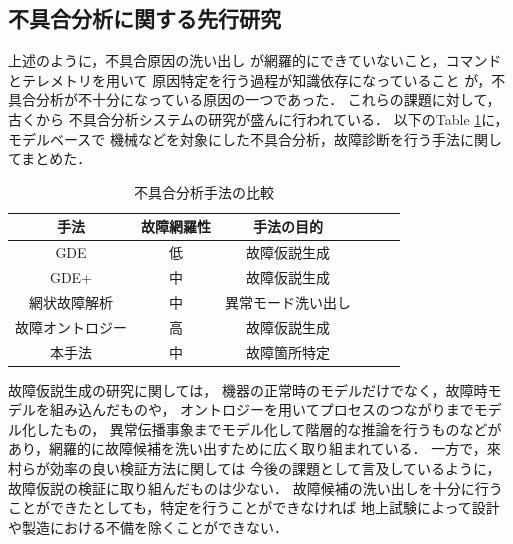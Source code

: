 \documentclass[11pt]{jsreport}
\begin{document}


\subsection{不具合分析に関する先行研究}
上述のように，不具合原因の洗い出し
が網羅的にできていないこと，コマンドとテレメトリを用いて
原因特定を行う過程が知識依存になっていること
が，不具合分析が不十分になっている原因の一つであった．%
これらの課題に対して，古くから%
不具合分析システムの研究が盛んに行われている．
以下のTable \ref{tab:previous_research}に，モデルベースで
機械などを対象にした不具合分析，故障診断を行う手法に関してまとめた．
\begin{table}[H]
   \centering
   \caption{不具合分析手法の比較}
   \label{tab:previous_research}
      \begin{tabular}{cccccc} \hline%
         手法&故障網羅性&手法の目的%
         \\ \hline
         GDE&低&故障仮説生成%
         \\ %
         GDE+\cite{Struss1989}&中&故障仮説生成%
         \\
         網状故障解析\cite{Yamaguchi2014}&中&異常モード洗い出し%
         \\
         故障オントロジー\cite{Kitamura1999}&高&故障仮説生成%
         \\
         本手法&中%
         &故障箇所特定%
         \\ \hline
      \end{tabular}
\end{table}
故障仮説生成の研究に関しては，
機器の正常時のモデルだけでなく，故障時モデルを組み込んだもの\cite{Struss1989}や，
オントロジーを用いてプロセスのつながりまでモデル化したもの\cite{Yamaguchi2014}，
異常伝播事象までモデル化して階層的な推論を行うもの\cite{Kitamura1999}などが
あり，網羅的に故障候補を洗い出すために広く取り組まれている．
一方で，來村ら\cite{Kitamura1999}が効率の良い検証方法に関しては
今後の課題として言及しているように，故障仮説の検証に取り組んだものは少ない．
故障候補の洗い出しを十分に行うことができたとしても，特定を行うことができなければ
地上試験によって設計や製造における不備を除くことができない．
\end{document}
